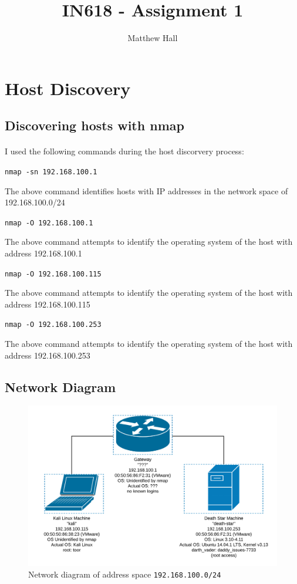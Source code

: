 \documentclass{article}
\title{IN618 - Assignment 1}
\author{Matthew Hall}
\date{}
\begin{document}
\maketitle
\newpage
{}

\tableofcontents
\newpage

\section{Host Discovery}

\subsection{Discovering hosts with nmap}
\paragraph{}
I used the following commands during the host discorvery process:

\texttt{nmap -sn 192.168.100.1}

The above command identifies hosts with IP addresses in the network space of 192.168.100.0/24

\texttt{nmap -O 192.168.100.1}

The above command attempts to identify the operating system of the host with address 192.168.100.1

\texttt{nmap -O 192.168.100.115}

The above command attempts to identify the operating system of the host with address 192.168.100.115

\texttt{nmap -O 192.168.100.253}

The above command attempts to identify the operating system of the host with address 192.168.100.253

\subsection{Network Diagram}

\begin{figure}[h!]
	\includegraphics[width=\linewidth]{resources/network-diagram.png}
	\caption{Network diagram of address space \texttt{192.168.100.0/24}}
	\label{fig:network-diagram}
\end{figure}
\end{document}
